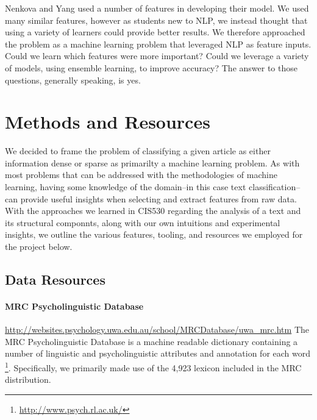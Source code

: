 \documentclass[
10pt, %
a4paper, %
oneside, %
headinclude,footinclude, %
BCOR5mm, %
]{scrartcl}
\begin{document}
Nenkova and Yang used a number of features in developing their model. We used
many similar features, however as students new to NLP, we instead thought that
using a variety of learners could provide better results. We therefore
approached the problem as a machine learning problem that leveraged NLP as
feature inputs. Could we learn which features were more important? Could we
leverage a variety of models, using ensemble learning, to improve accuracy? The
answer to those questions, generally speaking, is yes.

\newpage
 

\section{Methods and Resources}

We decided to frame the problem of classifying a given article as either 
information dense or sparse as primarilty a machine learning problem. As with
most problems that can be addressed with the methodologies of machine learning,
having some knowledge of the domain--in this case text classification--can 
provide useful insights when selecting and extract features from raw data. With 
the approaches we learned in CIS530 regarding the analysis of a text and
its structural componnts, along with our own intuitions and experimental 
insights, we outline the various features, tooling, and resources we employed 
for the project below.

\subsection{Data Resources}

\paragraph{\textbf{MRC Psycholinguistic Database}}
\hfill \newline \noindent \url{http://websites.psychology.uwa.edu.au/school/MRCDatabase/uwa_mrc.htm}
\hfill \newline \noindent The MRC Psycholinguistic Database is a machine readable
dictionary containing a number of linguistic and psycholinguistic
attributes and annotation for each word \footnote{\url{http://www.psych.rl.ac.uk/}}. 
Specifically, we primarily made use of the 4,923 lexicon included in the MRC 
distribution.
\end{document}
